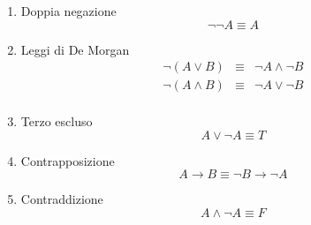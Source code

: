 \begin{enumerate}
    \item Doppia negazione
                \begin{equation}
                    \neg \neg A \equiv A
                \end{equation}
    \item Leggi di De Morgan
            \begin{align*}
                \neg (A \lor B) & \equiv & \neg A \land \neg B \\
                \neg(A \land B) & \equiv & \neg A \lor \neg B \\
            \end{align*}
    \item Terzo escluso
            \begin{equation}
                A \lor \neg A \equiv T
            \end{equation}
    \item Contrapposizione
            \begin{equation}
                A \rightarrow B \equiv \neg B \rightarrow \neg A
            \end{equation}
    \item Contraddizione
            \begin{equation}
                A \land \neg A \equiv F
            \end{equation}
\end{enumerate}
